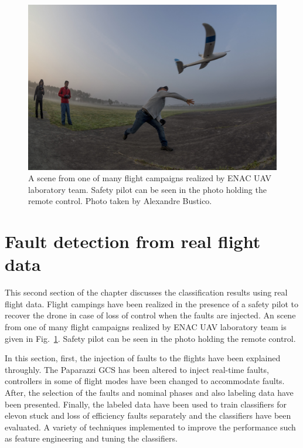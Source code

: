 \begin{figure}
\begin{center}
\includegraphics[width=1\textwidth]{figures/flightCampaign}    %
\caption{A scene from one of many flight campaigns realized by ENAC UAV laboratory team. Safety pilot can be seen in the photo holding the remote control. Photo taken by Alexandre Bustico.} 
\label{fig:flightCampaign}
\end{center}
\end{figure}

\section{Fault detection from real flight data}

This second section of the chapter discusses the classification results using real flight data. 
Flight campings have been realized in the presence of a safety pilot to recover the drone in case of loss of control when the faults are injected. 
An scene from one of many flight campaigns realized by ENAC UAV laboratory team is given in Fig.~\ref{fig:flightCampaign}. 
Safety pilot can be seen in the photo holding the remote control.

In this section, first, the injection of faults to the flights have been explained throughly. 
The Paparazzi GCS has been altered to inject real-time faults, controllers in some of flight modes have been changed to accommodate faults. 
After, the selection of the faults and nominal phases and also labeling data have been presented. 
Finally, the labeled data have been used to train classifiers for elevon stuck and loss of efficiency faults separately and the classifiers have been evaluated. 
A variety of techniques implemented to improve the performance such as feature engineering and tuning the classifiers. 

